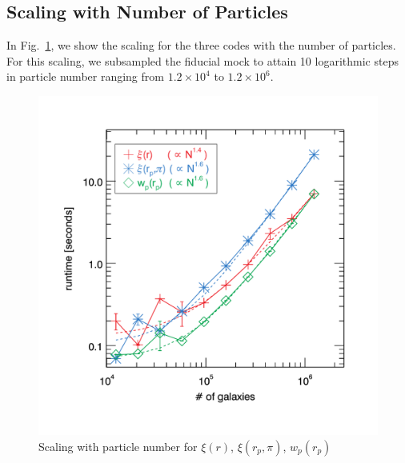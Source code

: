 \documentclass[preprint,authoryear,12pt]{elsarticle}
\newcommand{\xir}{\ensuremath{{\xi(r)}}\xspace}
\newcommand{\wprp}{\ensuremath{{w_p(r_p)}}\xspace}
\newcommand{\xirppi}{\ensuremath{{\xi(r_p,\pi)}}\xspace}
\begin{document}
\subsection{Scaling with Number of Particles}
In Fig.~\ref{fig:scaling_numpart}, we show the scaling for the three codes with the number of particles. For this scaling, we subsampled 
the fiducial mock to attain 10 logarithmic steps in particle number ranging from $1.2\times10^4$ to $1.2\times10^6$. 

\begin{figure}[htbp]
\includegraphics[clip=true,width=\linewidth]{timings_Mr19_numpart}%
\caption{Scaling with particle number for \xir, \xirppi, \wprp }
\label{fig:scaling_numpart}
\end{figure}
\end{document}
